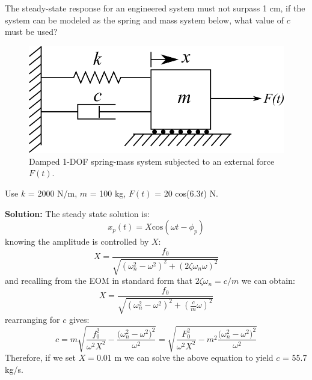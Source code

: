 \documentclass[12pt,letter]{article}
\begin{document}
\begin{example}



	The steady-state response for an engineered system must not surpass 1 cm, if the system can be modeled as the spring and mass system below, what value of $c$ must be used?  
	\begin{figure}[H]
		\centering
		\includegraphics[]{../figures/1-DOF-spring_dashpot_mass_horizontal_forced.png}
		\caption{Damped 1-DOF spring-mass system subjected to an external force $F(t)$.}
	\end{figure}	
	\noindent Use $k$ = 2000 N/m, $m$ = 100 kg, $F(t)$ = 20 cos($6.3t$) N. 			

	\noindent\textbf{Solution:} The steady state solution is:
	\begin{equation}
		x_p(t) = X \text{cos}(\omega t - \phi_p)
	\end{equation}			 
	knowing the amplitude is controlled by $X$: 
	\begin{equation}
		X = \frac{f_0}{\sqrt{(\omega_n^2 - \omega^2)^2 +  (2\zeta \omega_n \omega)^2}} 
	\end{equation}	
	and recalling from the EOM in standard form that $2\zeta \omega_n = c/m$ we can obtain:
	\begin{equation}
		X = \frac{f_0}{\sqrt{(\omega_n^2 - \omega^2)^2 +  (\frac{c}{m} \omega)^2}} 
	\end{equation}		
	rearranging for $c$ gives:		
	\begin{equation}
		c = m\sqrt{\frac{f_0^2}{\omega^2 X^2}-\frac{\big(\omega_n^2-\omega^2\big)^2}{\omega^2}} = \sqrt{\frac{F_0^2}{\omega^2 X^2}-m^2\frac{\big(\omega_n^2-\omega^2\big)^2}{\omega^2}} 
	\end{equation}
	Therefore, if we set $X=0.01$ m we can solve the above equation to yield $c$ = 55.7 kg/s.
	
\end{example}	
\end{document}
